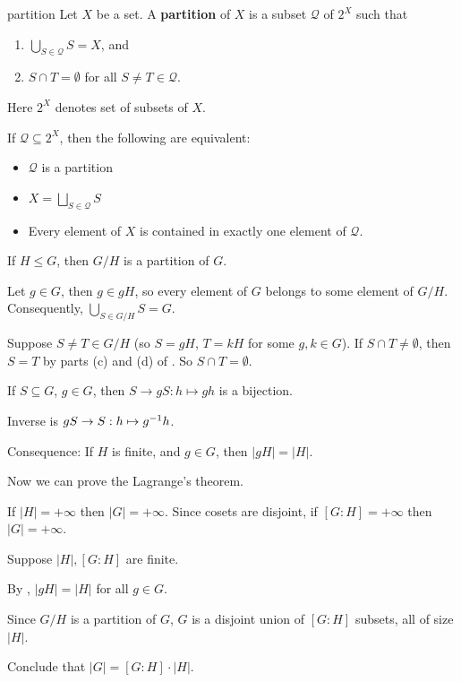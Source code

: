 \begin{defn}{partition}
Let $X$ be a set. A \textbf{partition} of $X$ is a subset $\mathcal{Q}$ of $2^X$ such that
\begin{enumerate}[label=(\alph*)]
\item $\bigcup_{S\in\mathcal Q} S=X$, and 
\item $S\cap T=\emptyset$ for all $S\ne T\in \mathcal Q$.
\end{enumerate}
\end{defn}
Here $2^X$ denotes set of subsets of $X$.

\begin{exercise}
If $\mathcal Q\subseteq 2^X$, then the following are equivalent:
\begin{itemize}
\item $\mathcal Q$ is a partition
\item $X=\bigsqcup_{S\in\mathcal Q} S$
\item Every element of $X$ is contained in exactly one element of $\mathcal Q$.
\end{itemize}
\end{exercise}

\begin{corr}
If $H\le G$, then $G/H$ is a partition of $G$.
\end{corr}

\begin{pf}
Let $g\in G$, then $g\in gH$, so every element of $G$ belongs to some element of $G/H$. Consequently, $\bigcup_{S\in G/H}S=G$.

Suppose $S\ne T\in G/H$ (so $S=gH$, $T=kH$ for some $g,k\in G$). If $S\cap T\ne \emptyset$, then $S=T$ by parts (c) and (d) of . So $S\cap T=\emptyset$.
\end{pf}

\begin{lemma}
If $S\subseteq G$, $g\in G$, then $S\to gS:h\mapsto gh$ is a bijection.
\end{lemma}

\begin{pf}
Inverse is $gS\to S: h\mapsto g^{-1} h$.
\end{pf}
Consequence: If $H$ is finite, and $g\in G$, then $|gH|=|H|$.

Now we can prove the Lagrange's theorem.

\begin{pf}
If $|H|=+\infty$ then $|G|=+\infty$. Since cosets are disjoint, if $[G:H]=+\infty$ then $|G|=+\infty$.

Suppose $|H|,[G:H]$ are finite.

By , $|gH|=|H|$ for all $g\in G$.

Since $G/H$ is a partition of $G$, $G$ is a disjoint union of $[G:H]$ subsets, all of size $|H|$.

Conclude that $|G|=[G:H]\cdot |H|$.
\end{pf}

